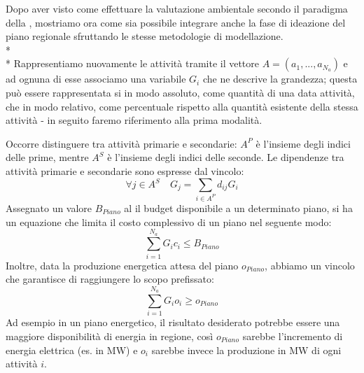 
Dopo aver visto come effettuare la valutazione ambientale secondo il paradigma della \clpr, mostriamo ora come sia possibile integrare anche la fase di ideazione del piano regionale sfruttando le stesse metodologie di modellazione.
\\*\\*
Rappresentiamo nuovamente le attività tramite il vettore $A = (a_1,...,a_{N_a})$ e ad ognuna di esse associamo una variabile $G_i$ che ne descrive la grandezza; questa può essere rappresentata si in modo assoluto, come quantità di una data attività, che in modo relativo, come percentuale rispetto alla quantità esistente della stessa attività - in seguito faremo riferimento alla prima modalità.

Occorre distinguere tra attività primarie e secondarie: $A^P$ è l'insieme degli indici delle prime, mentre $A^S$ è l'insieme degli indici delle seconde. Le dipendenze tra attività primarie e secondarie sono espresse dal vincolo:
\begin{equation}
\label{eq:primSec}
	\forall j \in A^S  \quad  G_j = \sum_{i \in A^P} d_{ij} G_i
\end{equation}
Assegnato un valore $B_{Piano}$ al il budget disponibile a un determinato piano, si ha un equazione che limita il costo complessivo di un piano nel seguente modo:
\begin{equation}
\label{eq:costoTotPrimSec}
	\sum_{i=1}^{N_a} G_i c_i \leq B_{Piano}
\end{equation}  
Inoltre, data la produzione energetica attesa del piano $o_{Piano}$, abbiamo un vincolo che garantisce di raggiungere lo scopo prefissato:
\begin{equation}
\label{eq:expOut}
	\sum_{i=1}^{N_a} G_i o_i \geq o_{Piano}
\end{equation}  
Ad esempio in un piano energetico, il risultato desiderato potrebbe essere una maggiore disponibilità di energia in regione, così $o_{Piano}$ sarebbe l'incremento di energia elettrica (es. in MW) e $o_i$ sarebbe invece la produzione in MW di ogni attività $i$.

